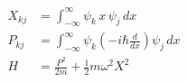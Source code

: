 \documentclass[12pt]{article}
\begin{document}
\begin{align*}
X_{kj}&=\int_{-\infty}^\infty \psi_k\,x\,\psi_j\,dx
\\[1ex]
P_{kj}&=\int_{-\infty}^\infty \psi_k\left(-i\hbar\frac{d}{dx}\right)\psi_j\,dx
\\[1ex]
H&=\frac{P^2}{2m}+\frac{1}{2}m\omega^2 X^2
\end{align*}
\end{document}
